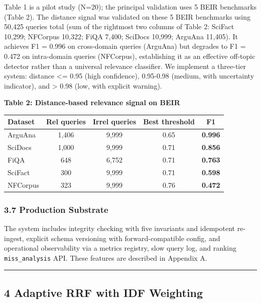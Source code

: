 \documentclass[
  11pt]{article}
\newcounter{none} %
\begin{document}
Table 1 is a pilot study (N=20); the principal validation uses 5 BEIR benchmarks (Table 2). The distance signal was validated on these 5 BEIR benchmarks using 50,425 queries total (sum of the rightmost two columns of Table 2: SciFact 10,299; NFCorpus 10,322; FiQA 7,400; SciDocs 10,999; ArguAna 11,405). It achieves F1 = 0.996 on cross-domain queries (ArguAna) but degrades to F1 = 0.472 on intra-domain queries (NFCorpus), establishing it as an effective off-topic detector rather than a universal relevance classifier. We implement a three-tier system: distance \textless= 0.95 (high confidence), 0.95-0.98 (medium, with uncertainty indicator), and \textgreater{} 0.98 (low, with explicit warning).

\textbf{Table 2: Distance-based relevance signal on BEIR}

{\def\LTcaptype{none} %
\begin{longtable}[]{@{}lcccc@{}}
\toprule\noalign{}
Dataset & Rel queries & Irrel queries & Best threshold & F1 \\
\midrule\noalign{}
\endhead
\bottomrule\noalign{}
\endlastfoot
ArguAna & 1,406 & 9,999 & 0.65 & \textbf{0.996} \\
SciDocs & 1,000 & 9,999 & 0.71 & \textbf{0.856} \\
FiQA & 648 & 6,752 & 0.71 & \textbf{0.763} \\
SciFact & 300 & 9,999 & 0.71 & \textbf{0.598} \\
NFCorpus & 323 & 9,999 & 0.76 & \textbf{0.472} \\
\end{longtable}
}

\subsubsection{3.7 Production Substrate}\label{production-substrate}

The system includes integrity checking with five invariants and idempotent re-ingest, explicit schema versioning with forward-compatible config, and operational observability via a metrics registry, slow query log, and ranking \texttt{miss\_analysis} API. These features are described in Appendix A.

\begin{center}\rule{0.5\linewidth}{0.5pt}\end{center}

\subsection{4 Adaptive RRF with IDF Weighting}\label{adaptive-rrf-with-idf-weighting}
\end{document}
